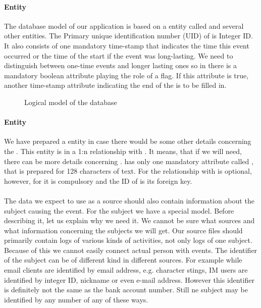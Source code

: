 \paragraph{Entity }
The database model of our application is based on a entity called  and several other entities. The Primary unique identification number (UID) of  is Integer ID. It also consists of one mandatory time-stamp that indicates the time this event occurred or the time of the start if the event was long-lasting. We need to distinguish between one-time events and longer lasting ones so in there is a mandatory boolean attribute  playing the role of a flag. If this attribute is true, another time-stamp attribute indicating the end of the  is to be filled in. 

\begin{figure}[!h]
    \centering 
    \epsfysize=180mm 
    \caption{Logical model of the database}\label{Logical}
\end{figure}

\paragraph{Entity }
We have prepared a entity  in case there would be some other details concerning the . This entity is in a 1:n relationship with . It means, that if we will need, there can be more details concerning .  has only one mandatory attribute called , that is prepared for 128 characters of text. For  the relationship with  is optional, however, for  it is compulsory and the ID of  is its foreign key. 

\paragraph{}
The data we expect to use as a source should also contain information about the subject causing the event. For the subject we have a special model. Before describing it, let us explain why we need it. We cannot be sure what sources and what information concerning the subjects we will get. Our source files should primarily contain logs of various kinds of activities, not only logs of one subject. Because of this we cannot easily connect actual person with events. The identifier of the subject can be of different kind in different sources. For example while email clients are identified by email address, e.g. character stings, IM users are identified by integer ID, nickname or even e-mail address. However this identifier is definitely not the same as the bank account number. Still ne subject may be identified by any number of any of these ways.

